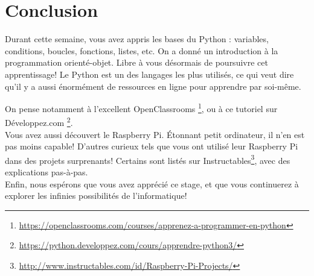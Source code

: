 \documentclass[12pt,a4paper,oneside]{report}
\begin{document}
\chapter{Conclusion}

Durant cette semaine, vous avez appris les bases du Python : variables, conditions, boucles, fonctions, listes, etc. On a donné un introduction à la programmation orienté-objet. Libre à vous désormais de poursuivre cet apprentissage! Le Python est un des langages les plus utilisés, ce qui veut dire qu'il y a aussi énormément de ressources en ligne pour apprendre par soi-même.

On pense notamment à l'excellent OpenClassrooms \footnote{\url{https://openclassrooms.com/courses/apprenez-a-programmer-en-python}}, ou à ce tutoriel sur Développez.com \footnote{\url{https://python.developpez.com/cours/apprendre-python3/}}.\\

Vous avez aussi découvert le Raspberry Pi. Étonnant petit ordinateur, il n'en est pas moins capable! D'autres curieux tels que vous ont utilisé leur Raspberry Pi dans des projets surprenants! Certains sont listés sur Instructables\footnote{\url{http://www.instructables.com/id/Raspberry-Pi-Projects/}}, avec des explications pas-à-pas.\\

Enfin, nous espérons que vous avez apprécié ce stage, et que vous continuerez à explorer les infinies possibilités de l'informatique!



\end{document}

